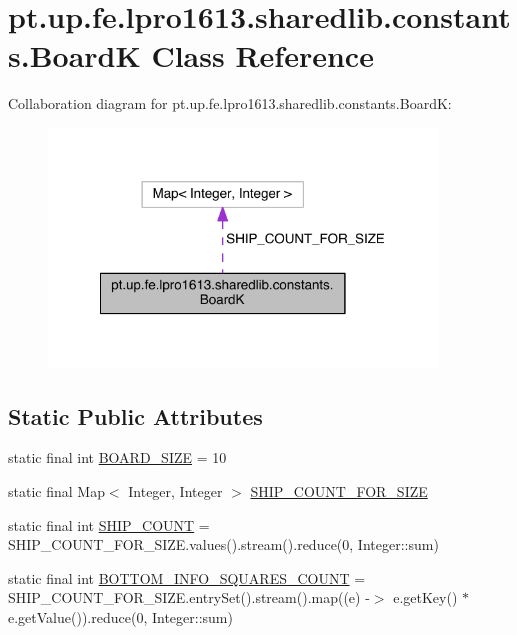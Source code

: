 \hypertarget{classpt_1_1up_1_1fe_1_1lpro1613_1_1sharedlib_1_1constants_1_1_board_k}{}\section{pt.\+up.\+fe.\+lpro1613.\+sharedlib.\+constants.\+BoardK Class Reference}
\label{classpt_1_1up_1_1fe_1_1lpro1613_1_1sharedlib_1_1constants_1_1_board_k}


Collaboration diagram for pt.\+up.\+fe.\+lpro1613.\+sharedlib.\+constants.\+BoardK\+:
\nopagebreak
\begin{figure}[H]
\begin{center}
\leavevmode
\includegraphics[width=293pt]{classpt_1_1up_1_1fe_1_1lpro1613_1_1sharedlib_1_1constants_1_1_board_k__coll__graph}
\end{center}
\end{figure}
\subsection*{Static Public Attributes}
\begin{DoxyCompactItemize}
\item 
static final int \hyperlink{classpt_1_1up_1_1fe_1_1lpro1613_1_1sharedlib_1_1constants_1_1_board_k_a5923011fc0f980adb643b4b972168c15}{B\+O\+A\+R\+D\+\_\+\+S\+I\+ZE} = 10
\item 
static final Map$<$ Integer, Integer $>$ \hyperlink{classpt_1_1up_1_1fe_1_1lpro1613_1_1sharedlib_1_1constants_1_1_board_k_af6ff24deb48459109356bdad0fca5e3b}{S\+H\+I\+P\+\_\+\+C\+O\+U\+N\+T\+\_\+\+F\+O\+R\+\_\+\+S\+I\+ZE}
\item 
static final int \hyperlink{classpt_1_1up_1_1fe_1_1lpro1613_1_1sharedlib_1_1constants_1_1_board_k_ae2fc4102eec84d733b9ca1136687284a}{S\+H\+I\+P\+\_\+\+C\+O\+U\+NT} = S\+H\+I\+P\+\_\+\+C\+O\+U\+N\+T\+\_\+\+F\+O\+R\+\_\+\+S\+I\+Z\+E.\+values().stream().reduce(0, Integer\+::sum)
\item 
static final int \hyperlink{classpt_1_1up_1_1fe_1_1lpro1613_1_1sharedlib_1_1constants_1_1_board_k_a7a93a877fdf11be9f98b8829fce752ca}{B\+O\+T\+T\+O\+M\+\_\+\+I\+N\+F\+O\+\_\+\+S\+Q\+U\+A\+R\+E\+S\+\_\+\+C\+O\+U\+NT} = S\+H\+I\+P\+\_\+\+C\+O\+U\+N\+T\+\_\+\+F\+O\+R\+\_\+\+S\+I\+Z\+E.\+entry\+Set().stream().map((e) -\/$>$ e.\+get\+Key() $\ast$ e.\+get\+Value()).reduce(0, Integer\+::sum)
\end{DoxyCompactItemize}



